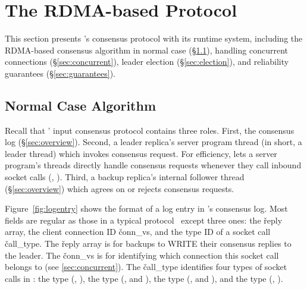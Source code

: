 \section{The RDMA-based \paxos Protocol} \label{sec:input}

This section presents \xxx's consensus protocol with its runtime system, 
including the RDMA-based consensus algorithm in normal case 
(\S\ref{sec:normal}), handling concurrent connections (\S\ref{sec:concurrent}), 
leader election (\S\ref{sec:election}), and reliability guarantees 
(\S\ref{sec:guarantees}).

\subsection{Normal Case Algorithm} \label{sec:normal}





Recall that \xxx' input consensus protocol contains three roles. First, the 
\paxos consensus log (\S\ref{sec:overview}). Second, a leader replica's server 
program thread (in short, a leader thread) which invokes consensus request. For 
efficiency, \xxx lets a server program's threads directly handle consensus 
requests whenever they call inbound socket calls (\eg, \recv). Third, a backup 
replica's \xxx internal follower thread (\S\ref{sec:overview}) which agrees on 
or rejects consensus requests.

Figure~\ref{fig:logentry} shows the format of a log entry in \xxx's consensus 
log. Most fields are regular as those in a typical \paxos 
protocol~\cite{paxos:practical} except three ones: the \v{reply} array, the 
client connection ID \v{conn\_vs}, and the type ID of a socket call 
\v{call\_type}. The \v{reply} array is for backups to WRITE their consensus 
replies to the leader. The \v{conn\_vs} is for identifying which connection this 
socket call belongs to (see \ref{sec:concurrent}). The \v{call\_type} 
identifies four types of socket calls in \xxx: the \accept type (\eg, \accept), 
the \recv type (\eg, \recv and \myread), the \send type (\eg, \send and 
\mywrite), and the \close type (\eg, \close).

